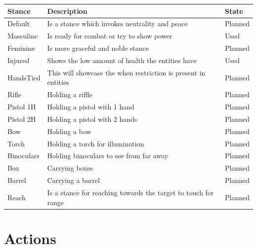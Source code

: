 \documentclass[10pt, letterpaper]{article}
\begin{document}
\begin{Form}
	\begin{center}
		\begin{tabular}{|l|l|l|}
			\hline
			Stance     & Description                                                    & State   \\
			\hline
			Default    & Is a stance which invokes neutrality and peace                 & Planned \\
			\hline
			Masculine  & Is ready for combat or try to show power                       & Used    \\
			\hline
			Feminine   & Is more graceful and noble stance                              & Planned \\
			\hline
			Injured    & Shows the low amount of health the entities have               & Used    \\
			\hline
			HandsTied  & This will showcase the when restriction is present in entities & Planned \\
			\hline
			Rifle      & Holding a riffle                                               & Planned \\
			\hline
			Pistol 1H  & Holding a pistol with 1 hand                                   & Planned \\
			\hline
			Pistol 2H  & Holding a pistol with 2 hands                                  & Planned \\
			\hline
			Bow        & Holding a bow                                                  & Planned \\
			\hline
			Torch      & Holding a torch for illumination                               & Planned \\
			\hline
			Binoculars & Holding binoculars to see from far away                        & Planned \\
			\hline
			Box        & Carrying boxes                                                 & Planned \\
			\hline
			Barrel     & Carrying a barrel                                              & Planned \\
			\hline
			Reach      & Is a stance for reaching towards the target to touch for range & Planned \\
			\hline
		\end{tabular}
	\end{center}

	\section{Actions}


\end{Form}
\end{document}
